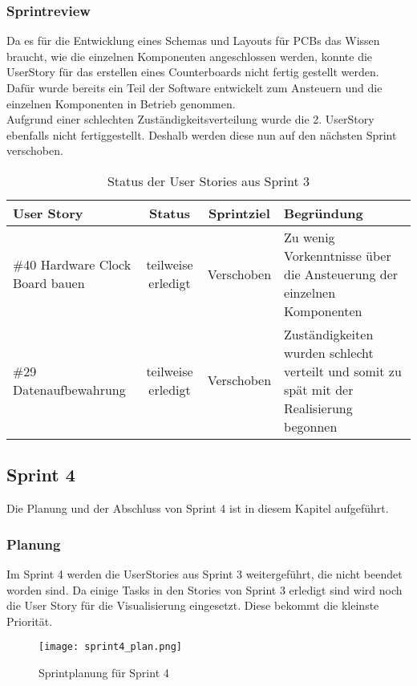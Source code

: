 \subsubsection*{Sprintreview}
Da es für die Entwicklung eines Schemas und Layouts für PCBs das Wissen braucht, wie die einzelnen Komponenten angeschlossen werden, konnte die UserStory für das erstellen eines Counterboards nicht fertig gestellt werden. Dafür wurde bereits ein Teil der Software entwickelt zum Ansteuern und die einzelnen Komponenten in Betrieb genommen.\\
Aufgrund einer schlechten Zuständigkeitsverteilung wurde die 2. UserStory ebenfalls nicht fertiggestellt. Deshalb werden diese nun auf den nächsten Sprint verschoben.
\begin{table}[H]
    \centering
    \begin{tabular}{p{4cm}ccp{7cm}}
        \textbf{User Story} &  \textbf{Status} & \textbf{Sprintziel}& \textbf{Begründung}\\\toprule[2pt]
        \#40 Hardware Clock Board bauen & teilweise erledigt & Verschoben & Zu wenig Vorkenntnisse über die Ansteuerung der einzelnen Komponenten\\
        \#29 Datenaufbewahrung & teilweise erledigt & Verschoben & Zuständigkeiten wurden schlecht verteilt und somit zu spät mit der Realisierung begonnen\\
    \end{tabular}
    \caption{Status der User Stories aus Sprint 3}
\end{table}

\clearpage
\subsection*{Sprint 4}
Die Planung und der Abschluss von Sprint 4 ist in diesem Kapitel aufgeführt.
\subsubsection*{Planung}
Im Sprint 4 werden die UserStories aus Sprint 3 weitergeführt, die nicht beendet worden sind. Da einige Tasks in den Stories von Sprint 3 erledigt sind wird noch die User Story für die Visualisierung eingesetzt. Diese bekommt die kleinste Priorität.
\begin{figure}[H]
    \centering
    \texttt{[image: sprint4\_plan.png]}
    \caption{Sprintplanung für Sprint 4}
\end{figure}

